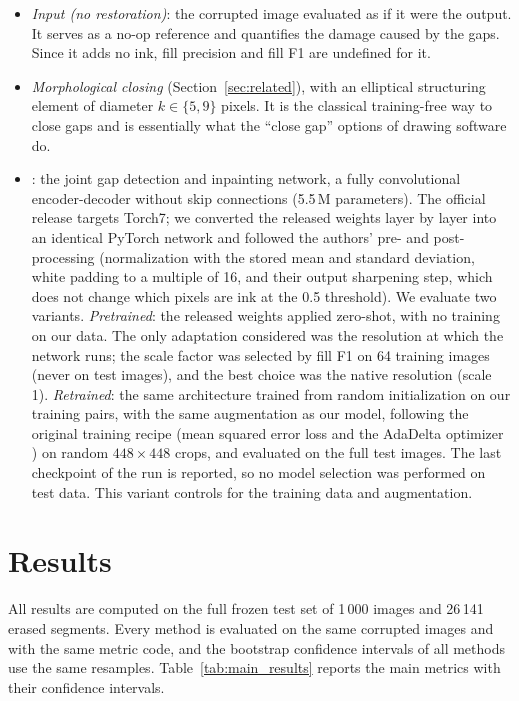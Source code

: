 \documentclass[11pt]{article}
\begin{document}
\begin{itemize}
\item \emph{Input (no restoration)}: the corrupted image evaluated as if it were the
  output. It serves as a no-op reference and quantifies the damage caused by the gaps. Since it
  adds no ink, fill precision and fill F1 are undefined for it.
\item \emph{Morphological closing} \citep{serra1982morphology,soille2003morphological}
  (Section~\ref{sec:related}), with an elliptical structuring element of diameter
  $k \in \{5, 9\}$ pixels. It is the classical training-free way to close gaps and
  is essentially what the ``close gap'' options of drawing software do.
\item \emph{\citet{sasaki2017joint}}: the joint gap detection and
  inpainting network, a fully convolutional encoder-decoder without skip connections
  (5.5\,M parameters). The official release targets Torch7; we converted the released
  weights layer by layer into an identical PyTorch network and followed the authors'
  pre- and post-processing (normalization with the stored mean and standard deviation,
  white padding to a multiple of 16, and their output sharpening step, which does not
  change which pixels are ink at the 0.5 threshold). We evaluate two variants.
  \emph{Pretrained}: the released weights applied zero-shot, with no training on our
  data. The only adaptation considered was the resolution at which the network runs;
  the scale factor was selected by fill F1 on 64 training images (never on test
  images), and the best choice was the native resolution (scale 1). \emph{Retrained}:
  the same architecture trained from random initialization on our training pairs, with
  the same augmentation as our model, following the original training recipe (mean
  squared error loss and the AdaDelta optimizer \citep{zeiler2012adadelta}) on random
  $448\times 448$ crops, and evaluated on the full test images. The last checkpoint of
  the run is reported, so no model selection was performed on test data. This variant controls for the training data and augmentation.
\end{itemize}

\section{Results}
\label{sec:results}

All results are computed on the full frozen test set of 1\,000 images and 26\,141
erased segments. Every method is evaluated on the same corrupted images and with the
same metric code, and the bootstrap confidence intervals of all methods use the same
resamples. Table~\ref{tab:main_results} reports the main metrics with their
confidence intervals.
\end{document}
